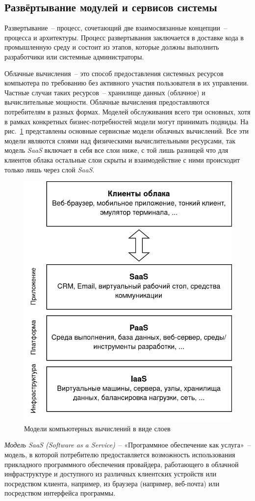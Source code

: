 \subsection{Развёртывание модулей и сервисов системы}
\label{sub:system-design:deployment}

Развертывание~-- процесс, сочетающий две взаимосвязанные концепции~-- процесса и архитектуры. Процесс развертывания заключается в доставке кода в промышленную среду и состоит из этапов, которые должны выполнить разработчики или системные администраторы.

Облачные вычисления~-- это способ предоставления системных ресурсов компьютера по требованию без активного участия пользователя в их управлении. Частные случаи таких ресурсов~-- хранилище данных (облачное) и вычислительные мощности. Облачные вычисления предоставляются потребителям в разных формах. Моделей обслуживания всего три основных, хотя в рамках конкретных бизнес-потребностей модели могут принимать подвиды. На рис.~\ref{fig:cloud-computing-service-models} представлены основные сервисные модели облачных вычислений. Все эти модели являются слоями над физическими вычислительными ресурсами, так модель \textit{SaaS} включает в себя все слои ниже, с той лишь разницей что для клиентов облака остальные слои скрыты и взаимодействие с ними происходит только лишь через слой \textit{SaaS}.

\begin{figure}[h]
\centering
    \includegraphics[width=0.5\linewidth]{assets/cloud-computing-service-models.png}
    \caption{Модели компьютерных вычислений в виде слоев}
    \label{fig:cloud-computing-service-models}
\end{figure}

\textit{Модель SaaS (Software as a Service)}~-- «Программное обеспечение как услуга»~-- модель, в которой потребителю предоставляется возможность использования прикладного программного обеспечения провайдера, работающего в облачной инфраструктуре и доступного из различных клиентских устройств или посредством клиента, например, из браузера (например, веб-почта) или посредством интерфейса программы.

